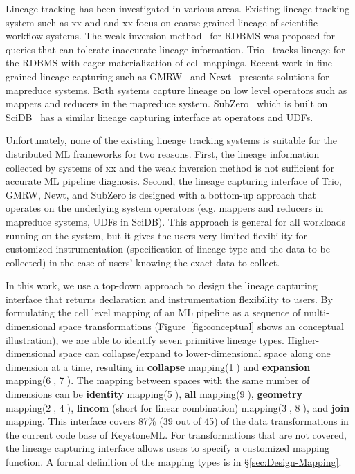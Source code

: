 \documentclass{sig-alternate}
\begin{document}
Lineage tracking has been investigated in various areas.
Existing lineage tracking system such as xx and and xx focus on coarse-grained lineage of scientific workflow systems.
The weak inversion method~\cite{woodruff97} for RDBMS was proposed for queries that can tolerate inaccurate lineage information.
Trio~\cite{widom04} tracks lineage for the RDBMS with eager materialization of cell mappings.
Recent work in fine-grained lineage capturing such as GMRW~\cite{ikeda11} and Newt~\cite{logothetis13} presents
solutions for mapreduce systems. 
Both systems capture lineage on low level operators such as mappers and reducers in the mapreduce system.
SubZero~\cite{wu13} which is built on SciDB~\cite{brown10} has a similar lineage capturing interface at operators and UDFs.

Unfortunately, none of the existing lineage tracking systems is suitable for the distributed ML frameworks for two reasons.
First, the lineage information collected by systems of xx and the weak inversion method is not sufficient for accurate ML pipeline diagnosis.
Second, the lineage capturing interface of Trio, GMRW, Newt, and SubZero is designed with a bottom-up approach
that operates on the underlying system operators (e.g. mappers and reducers in mapreduce systems, UDFs in SciDB). 
This approach is general for all workloads running on the system, but it gives the users very limited flexibility for customized
instrumentation (specification of lineage type and the data to be collected) in the case of users' knowing the exact data to collect.

In this work, we use a top-down approach to design the lineage capturing interface that returns declaration and instrumentation
flexibility to users. By formulating the cell level mapping of an ML pipeline as a sequence of multi-dimensional space transformations
(Figure~\ref{fig:conceptual} shows an conceptual illustration), we are able to identify seven primitive lineage types.
Higher-dimensional space can collapse/expand to lower-dimensional space along one dimension at a time, 
resulting in {\bf collapse} mapping(\textcircled{1}) and {\bf expansion} mapping(\textcircled{6}, \textcircled{7}). 
The mapping between spaces with the same number of dimensions can be {\bf identity} mapping(\textcircled{5}), {\bf all} mapping(\textcircled{9}), 
{\bf geometry} mapping(\textcircled{2}, \textcircled{4}), {\bf lincom} (short for linear combination) mapping(\textcircled{3}, \textcircled{8}),
and {\bf join} mapping. 
This interface covers 87\% (39 out of 45) of the data transformations in the current code base of KeystoneML. 
For transformations that are not covered, the lineage capturing interface allows users to specify a customized mapping function.
A formal definition of the mapping types is in \S\ref{sec:Design-Mapping}.
\end{document}
